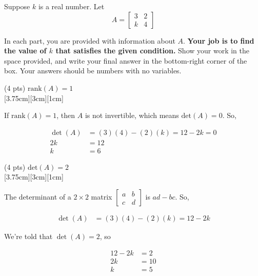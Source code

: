 \documentclass[11pt]{article}
\begin{document}
\begin{prob}[(12 pts)]
Suppose $k$ is a real number. Let $$A = \begin{bmatrix} 3 & 2 \\ k & 4 \end{bmatrix}$$

In each part, you are provided with information about $A$. \textbf{Your job is to find the value of $k$ that satisfies the given condition.} Show your work in the space provided, and write your final answer in the bottom-right corner of the box. Your answers should be numbers with no variables.

\begin{subprob}(4 pts) $\text{rank}(A) = 1$ \\

[3.75cm][3cm][1cm]

\begin{solution}
If $\text{rank}(A) = 1$, then $A$ is not invertible, which means $\text{det}(A) = 0$. So,

\begin{align*}
\det(A) &= (3)(4) - (2)(k) = 12 - 2k = 0 \\
2k &= 12 \\
k &= 6
\end{align*}
\end{solution}
\end{subprob}

\begin{subprob}(4 pts) $\text{det}(A) = 2$ \\

[3.75cm][3cm][1cm]

\begin{solution}
The determinant of a $2 \times 2$ matrix $\begin{bmatrix} a & b \\ c & d \end{bmatrix}$ is $ad - bc$. So,

\begin{align*}
\det(A) &= (3)(4) - (2)(k) = 12 - 2k
\end{align*}

We're told that $\det(A) = 2$, so

\begin{align*}
12 - 2k &= 2 \\
2k &= 10 \\
k &= 5
\end{align*}
\end{solution}
\end{subprob}


\end{prob}
\end{document}
